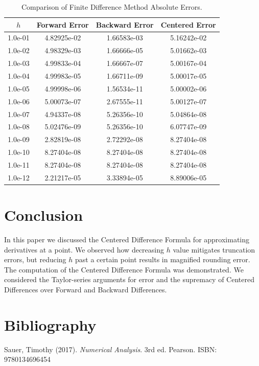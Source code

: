 \documentclass{article}
\begin{document}
\begin{table}[ht]
\centering
\begin{tabular}{|c|c|c|c|}
\hline
$h$ & Forward Error & Backward Error & Centered Error \\
\hline
1.0e-01 & 4.82925e-02   & 1.66583e-03    & 5.16242e-02    \\
1.0e-02 & 4.98329e-03   & 1.66666e-05    & 5.01662e-03    \\
1.0e-03 & 4.99833e-04   & 1.66667e-07    & 5.00167e-04    \\
1.0e-04 & 4.99983e-05   & 1.66711e-09    & 5.00017e-05    \\
1.0e-05 & 4.99998e-06   & 1.56534e-11    & 5.00002e-06    \\
1.0e-06 & 5.00073e-07   & 2.67555e-11    & 5.00127e-07    \\
1.0e-07 & 4.94337e-08   & 5.26356e-10    & 5.04864e-08    \\
1.0e-08 & 5.02476e-09   & 5.26356e-10    & 6.07747e-09    \\
1.0e-09 & 2.82819e-08   & 2.72292e-08    & 8.27404e-08    \\
1.0e-10 & 8.27404e-08   & 8.27404e-08    & 8.27404e-08    \\
1.0e-11 & 8.27404e-08   & 8.27404e-08    & 8.27404e-08    \\
1.0e-12 & 2.21217e-05   & 3.33894e-05    & 8.89006e-05    \\
\hline
\end{tabular}
\caption{Comparison of Finite Difference Method Absolute Errors.}
\end{table}

\clearpage

\section{Conclusion}

In this paper we discussed the Centered Difference Formula for approximating derivatives at a point. We observed how decreasing $h$ value mitigates 
truncation errors, but reducing $h$ past a certain point results in magnified rounding error. The computation of the Centered Difference Formula was 
demonstrated. We considered the Taylor-series arguments for error and the supremacy of Centered Differences over Forward and Backward Differences.

\section{Bibliography}

Sauer, Timothy (2017). \textit{Numerical Analysis}. 3rd ed. Pearson. 
ISBN: 9780134696454
\end{document}
